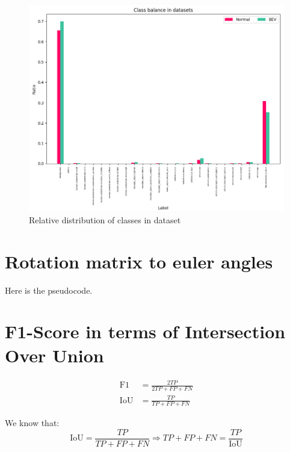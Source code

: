 \begin{figure}[h!]
    \centering
    \includegraphics[width=\linewidth]{images/appendix/dataset_class_balance_ratio.png}
    \caption{Relative distribution of classes in dataset}
    \label{fig:dataset_class_balance_ratio}
\end{figure}

\section{Rotation matrix to euler angles}
Here \cite{euler_from_matrix} is the pseudocode.

\section{F1-Score in terms of Intersection Over Union} \label{appendix:f1_iou}
\begin{equation}
    \begin{aligned}
    \text{F1} &= \frac{2TP}{2TP + FP + FN} \\
    \text{IoU} &= \frac{TP}{TP + FP + FN}
    \end{aligned}
    \label{eq:system}
    \end{equation}
    
    \noindent
    We know that:
    \[
    \text{IoU} = \frac{TP}{TP + FP + FN} \Rightarrow TP + FP + FN = \frac{TP}{\text{IoU}}
    \]
    
